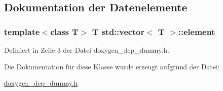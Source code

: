 \subsection{Dokumentation der Datenelemente}
\hypertarget{classstd_1_1vector_aa4413180f775cf542ab040103fb94438}{
\subsubsection[{element}]{\setlength{\rightskip}{0pt plus 5cm}template$<$class T$>$ T {\bf std\-::vector}$<$ T $>$\-::element}}\label{classstd_1_1vector_aa4413180f775cf542ab040103fb94438}


Definiert in Zeile 3 der Datei doxygen\-\_\-dep\-\_\-dummy.\-h.



Die Dokumentation für diese Klasse wurde erzeugt aufgrund der Datei\-:\begin{DoxyCompactItemize}
\item 
\hyperlink{doxygen__dep__dummy_8h}{doxygen\-\_\-dep\-\_\-dummy.\-h}\end{DoxyCompactItemize}
